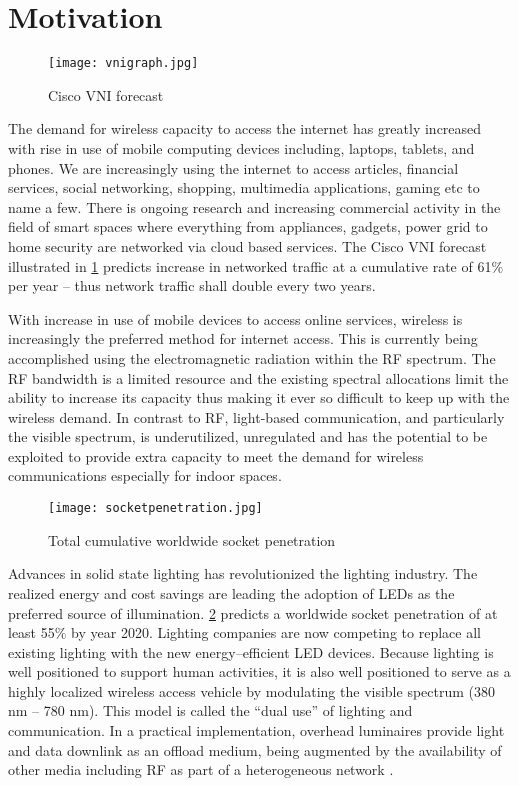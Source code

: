 \section{Motivation}
\label{sec:motivation}
\graphicspath{{_Intro/Figures/}}

\begin{figure}[!b]
	\centering
		\texttt{[image: vnigraph.jpg]}
	\caption{Cisco VNI forecast}
	\label{fig:vnigraph}
\end{figure}

The demand for wireless capacity to access the internet has greatly increased with rise in use of mobile computing devices including, laptops, tablets, and phones. We are increasingly using the internet to access articles, financial services, social networking, shopping, multimedia applications, gaming etc to name a few. There is ongoing research and increasing commercial activity in the field of smart spaces where everything from appliances, gadgets, power grid to home security are networked via cloud based services. The Cisco VNI forecast illustrated in \figurename{ \ref{fig:vnigraph}} predicts increase in networked traffic at a cumulative rate of 61$\%$ per year -- thus network traffic shall double every two years. 

With increase in use of mobile devices to access online services, wireless is increasingly the preferred method for internet access. This is currently being accomplished using the electromagnetic radiation within the RF spectrum. The RF bandwidth is a limited resource and the existing spectral allocations limit the ability to increase its capacity thus making it ever so difficult to keep up with the wireless demand. In contrast to RF, light-based communication, and particularly the visible spectrum, is underutilized, unregulated and has the potential to be exploited to provide extra capacity to meet the demand for wireless communications especially for indoor spaces. 

\begin{figure}[!t]
	\centering
		\texttt{[image: socketpenetration.jpg]}
	\caption{Total cumulative worldwide socket penetration}
	\label{fig:socketpenetration}
\end{figure}

Advances in solid state lighting has revolutionized the lighting industry. The realized energy and cost savings are leading the adoption of LEDs as the preferred source of illumination. \figurename{ \ref{fig:socketpenetration}} \cite{bar11a} predicts a worldwide socket penetration of at least 55$\%$ by year 2020. Lighting companies are now competing to replace all existing lighting with the new energy--efficient LED devices. Because lighting is well positioned to support human activities, it is also well positioned to serve as a highly localized wireless access vehicle by modulating the visible spectrum (380 nm -- 780 nm). This model is called the ``dual use'' of lighting and communication.  In a practical implementation, overhead luminaires provide light and data downlink as an offload medium, being augmented by the availability of other media including RF as part of a heterogeneous network \cite{gan13a,rah15a}. 

